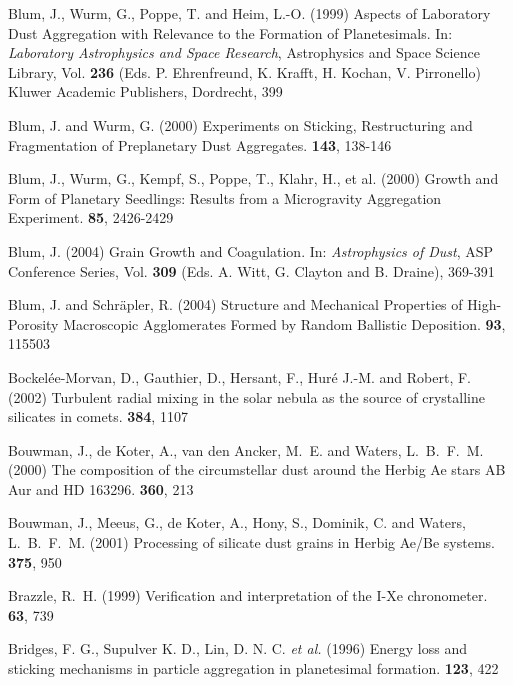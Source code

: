 \begin{literature}
\item 
Blum, J., Wurm, G., Poppe, T. and Heim, L.-O. (1999) Aspects of Laboratory Dust
Aggregation with Relevance to the Formation of Planetesimals. In:
\textit{Laboratory Astrophysics and Space Research}, Astrophysics and Space
Science Library, Vol. \textbf{236} (Eds. P. Ehrenfreund, K. Krafft, H. Kochan,
V. Pirronello) Kluwer Academic Publishers, Dordrecht, 399

\item 
Blum, J. and Wurm, G. (2000) Experiments on Sticking, Restructuring and
Fragmentation of Preplanetary Dust Aggregates. \ica \textbf{143}, 138-146

\item 
Blum, J., Wurm, G., Kempf, S., Poppe, T., Klahr, H., et al. (2000) Growth
and Form of Planetary Seedlings: Results from a Microgravity Aggregation
Experiment.
\prl \textbf{85}, 2426-2429

\item 
Blum, J. (2004) Grain Growth and Coagulation. In: \textit{Astrophysics of
Dust}, ASP Conference Series, Vol. \textbf{309} (Eds. A. Witt, G. Clayton and
B. Draine), 369-391

\item 
Blum, J. and Schr\"apler, R. (2004) Structure and Mechanical Properties of
High-Porosity Macroscopic Agglomerates Formed by Random Ballistic Deposition.
\prl \textbf{93}, 115503

\item 
Bockel\'ee-Morvan, D., Gauthier, D., Hersant, F., Hur\'e J.-M. and Robert,
F.  (2002) Turbulent radial mixing in the solar nebula as the source of
crystalline silicates in comets. \aap \textbf{384}, 1107

\item 
Bouwman, J., de Koter, A., van den Ancker, M.~E. and Waters,
L.~B.~F.~M. (2000) The composition of the circumstellar dust around the
Herbig Ae stars AB Aur and HD 163296. \aap \textbf{360}, 213

\item 
Bouwman, J., Meeus, G., de Koter, A., Hony, S., Dominik, C. and Waters,
L.~B.~F.~M. (2001) Processing of silicate dust grains in Herbig Ae/Be
systems.
\aap \textbf{375}, 950

\item 
Brazzle, R.~H. (1999) Verification and interpretation of the I-Xe chronometer.
\gca \textbf{63}, 739

\item 
Bridges, F. G., Supulver K. D., Lin, D. N. C. {\it et al.}
(1996) Energy loss and sticking mechanisms in particle aggregation in
planetesimal formation. \ica \textbf{123}, 422


\end{literature}
